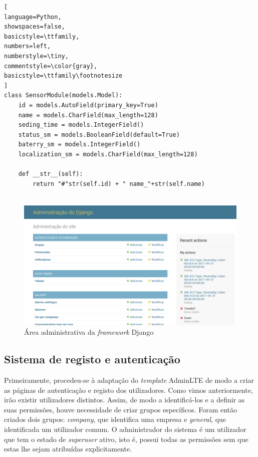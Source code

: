 \begin{lstlisting}[
language=Python,
showspaces=false,
basicstyle=\ttfamily,
numbers=left,
numberstyle=\tiny,
commentstyle=\color{gray},
basicstyle=\ttfamily\footnotesize
]
class SensorModule(models.Model):
	id = models.AutoField(primary_key=True)
	name = models.CharField(max_length=128)
	seding_time = models.IntegerField()
	status_sm = models.BooleanField(default=True)
	baterry_sm = models.IntegerField()
	localization_sm = models.CharField(max_length=128)
		
	def __str__(self):
		return "#"str(self.id) + " name_"+str(self.name)


\end{lstlisting}

\begin{figure}[!htb]
	\centering
	\includegraphics[scale=0.4]{prints-web/admindjango.png}
	\caption{Área administrativa da \textit{framework} Django }
	\label{admingdjango}
\end{figure}

\subsection{Sistema de registo e autenticação}

Primeiramente, procedeu-se à adaptação do \textit{template} AdminLTE de modo a criar as páginas de autenticação e registo dos utilizadores. Como vimos anteriormente, irão existir utilizadores distintos. Assim, de modo a identificá-los e a definir as suas permissões, houve necessidade de criar grupos específicos. Foram então criados dois grupos:  \textit{company}, que identifica uma empresa e \textit{general}, que identificada um utilizador comum. O administrador do sistema é um utilizador que tem o estado de \textit{superuser} ativo, isto é, possui todas as permissões sem que estas lhe sejam atribuídas explicitamente.

